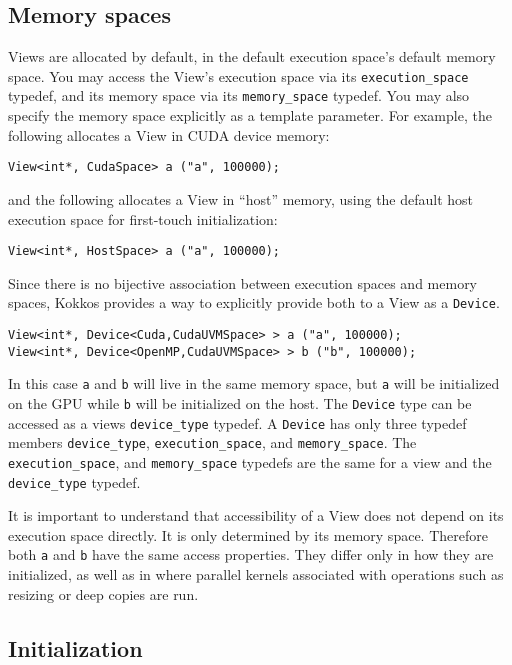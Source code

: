 \subsection{Memory spaces}

Views are allocated by default, in the default execution space's
default memory space.  You may access the View's execution space via
its \lstinline!execution_space! typedef, and its memory space via its
\lstinline!memory_space! typedef.  You may also specify the memory space
explicitly as a template parameter.  For example, the following
allocates a View in CUDA device memory:
\begin{lstlisting}
View<int*, CudaSpace> a ("a", 100000);
\end{lstlisting}
and the following allocates a View in ``host'' memory, using the default 
host execution space for first-touch initialization:
\begin{lstlisting}
View<int*, HostSpace> a ("a", 100000);
\end{lstlisting}

Since there is no bijective association between execution spaces and memory 
spaces, Kokkos provides a way to explicitly provide both to a View as a 
\lstinline|Device|. 
\begin{lstlisting}
View<int*, Device<Cuda,CudaUVMSpace> > a ("a", 100000);
View<int*, Device<OpenMP,CudaUVMSpace> > b ("b", 100000);
\end{lstlisting}
In this case \lstinline|a| and \lstinline|b| will live in the same memory space,
but \lstinline|a| will be initialized on the GPU while \lstinline|b| will be 
initialized on the host. 
The \lstinline|Device| type can be accessed as a views \lstinline|device_type|
typedef. A \lstinline|Device| has only three typedef members 
\lstinline|device_type|, \lstinline|execution_space|, and \lstinline|memory_space|.
The \lstinline|execution_space|, and \lstinline|memory_space| typedefs are
the same for a view and the \lstinline|device_type| typedef.

It is important to understand that accessibility of a View does not 
depend on its execution space directly. It is only determined by its
memory space. Therefore both \lstinline|a| and \lstinline|b| have the 
same access properties. They differ only in how they are initialized, 
as well as in where parallel kernels associated with operations such 
as resizing or deep copies are run. 

\subsection{Initialization}

